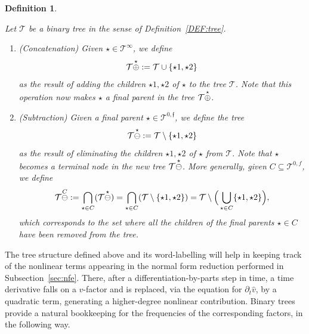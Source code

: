 \documentclass[a4paper,
11pt,  reqno]{amsart}
\makeatletter
\newcommand{\5}{\textup{V}}
\newcommand{\dt}{\partial_t}
\newtheorem{definition}[theorem]{Definition}
\theoremstyle{remark}
\newcommand{\TT}{\mathcal{T}}
\newcommand{\ff}{\mathfrak{f}}
\def\<#1>{\csname MH@symb@#1\endcsname}
\numberwithin{equation}{section}
\numberwithin{theorem}{section}
\makeatother
\begin{document}
\begin{definition} 
\label{DEF:tree3}
\rm

Let $\TT$ be a binary tree in the sense of Definition~\ref{DEF:tree}. 


\begin{enumerate}




\smallskip
\item[(i)] (Concatenation)  
Given $ \star \in \TT^\infty$, we define
$$
\TT \overset{\star}{\oplus} \<1>
: = \TT \cup \{\star1, \star2\}
$$
as the result of adding the children $\star1,\star2$ of $\star$ to the tree $\TT$. 
Note that this operation now makes $\star$ a final parent in the tree $\TT \overset{\star}{\oplus} \<1>$. 




\smallskip
\item[(ii)] (Subtraction) 
Given a final parent $\star  \in \TT^{0,\ff}$, we define the tree
$$
\TT \overset{\star }{\ominus } \<1>
: = \TT \setminus \{ \star1, \star2  \}
$$
as the result of eliminating the children $\star1, \star2$ of $\star$
from $\TT$. Note that $\star$ becomes a terminal node in the new tree $\TT \overset{\star}{\ominus } \<1>$. 
More generally, given $C\subseteq \TT^{0,f}$, we define
\begin{align}
\label{treeSubtr}
\TT \overset{C}{\ominus} \<1> : =
 \bigcap_{\star \in C} ( \TT \overset{\star}{\ominus}  \<1>)
= \bigcap_{\star\in C} (\TT \setminus \{\star1,\star2\})
= \TT \setminus \Big( \bigcup_{\star\in C} \{\star1,\star2\} \Big), 
\end{align}
which corresponds to the set where all the children of the final parents $\star\in C$ have been removed from the tree.


\end{enumerate}



\end{definition}



The tree structure defined above and its word-labelling will help in keeping track of the nonlinear terms appearing in the normal form reduction performed in Subsection~\ref{sec:nfe}. There, after a differentiation-by-parts step in time, a time derivative falls on a $v$-factor and is replaced, via the equation for $\dt \widehat v$, by a quadratic term, generating a higher-degree nonlinear contribution. Binary trees provide a natural bookkeeping for the frequencies of the corresponding factors, in the following way.
\end{document}
